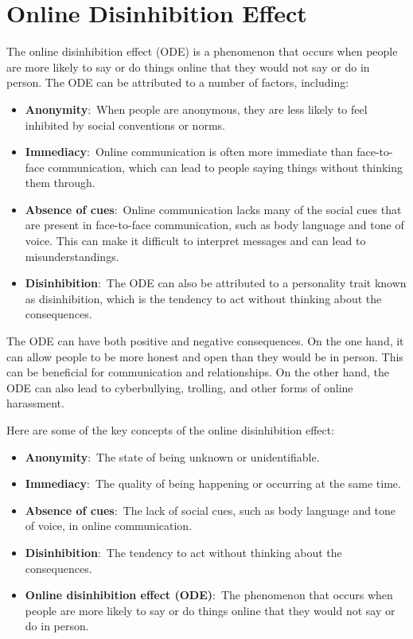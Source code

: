 \documentclass[
  b5paper]{book}
\begin{document}
\hypertarget{online-disinhibition-effect}{%
\section{Online Disinhibition Effect}\label{online-disinhibition-effect}}

The online disinhibition effect (ODE) is a phenomenon that occurs when people are more likely to say or do things online that they would not say or do in person. The ODE can be attributed to a number of factors, including:

\begin{itemize}
\item
  \textbf{Anonymity}:~When people are anonymous, they are less likely to feel inhibited by social conventions or norms.
\item
  \textbf{Immediacy}:~Online communication is often more immediate than face-to-face communication, which can lead to people saying things without thinking them through.
\item
  \textbf{Absence of cues}:~Online communication lacks many of the social cues that are present in face-to-face communication, such as body language and tone of voice. This can make it difficult to interpret messages and can lead to misunderstandings.
\item
  \textbf{Disinhibition}:~The ODE can also be attributed to a personality trait known as disinhibition, which is the tendency to act without thinking about the consequences.
\end{itemize}

The ODE can have both positive and negative consequences. On the one hand, it can allow people to be more honest and open than they would be in person. This can be beneficial for communication and relationships. On the other hand, the ODE can also lead to cyberbullying, trolling, and other forms of online harassment.

Here are some of the key concepts of the online disinhibition effect:

\begin{itemize}
\item
  \textbf{Anonymity}:~The state of being unknown or unidentifiable.
\item
  \textbf{Immediacy}:~The quality of being happening or occurring at the same time.
\item
  \textbf{Absence of cues}:~The lack of social cues, such as body language and tone of voice, in online communication.
\item
  \textbf{Disinhibition}:~The tendency to act without thinking about the consequences.
\item
  \textbf{Online disinhibition effect (ODE)}:~The phenomenon that occurs when people are more likely to say or do things online that they would not say or do in person.
\end{itemize}
\end{document}
